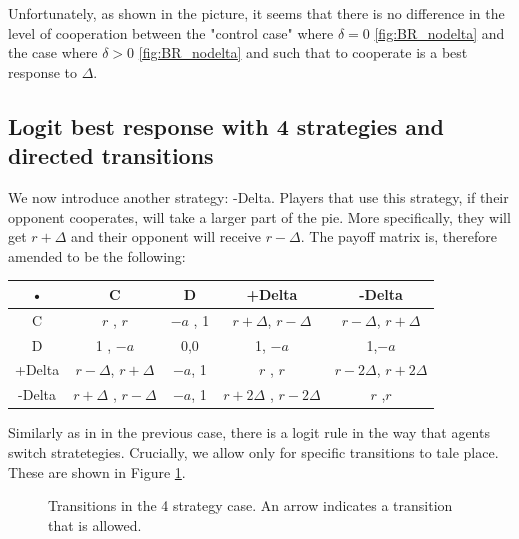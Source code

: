 \documentclass{article}
\begin{document}
Unfortunately, as shown in the picture, it seems that there is no difference in the level of cooperation between the "control case" where $\delta=0$ \ref{fig:BR_nodelta} and the case where $\delta>0$  \ref{fig:BR_nodelta} and such that to cooperate is a best response to $\Delta$.


\subsection{Logit best response with 4 strategies and directed transitions}
We now introduce another strategy: -Delta. Players that use this strategy, if their opponent cooperates, will take a larger part of the pie. More specifically, they will get $r+\Delta$ and their opponent will receive $r-\Delta$. The payoff matrix is, therefore amended to be the following:
\begin{center}
\begin{tabular}{|c|c|c|c|c|}
\hline 
• & C & D &+Delta & -Delta  \\ 
\hline 
C & $r$ , $r$ & $-a$ , 1 & $r+\Delta$, $r-\Delta$ & $r-\Delta$, $r+\Delta$ \\ 
\hline 
D & 1 , $-a$ & 0,0 & 1, $-a$ & 1,$-a$\\ 
\hline 
+Delta & $r -\Delta$, $r+\Delta$ & $-a$, 1 & $r$ , $r$& $r-2\Delta$, $r+2\Delta$ \\ 
\hline 
-Delta & $r+\Delta$ , $r-\Delta$ & $-a$, 1 & $r+2\Delta$ , $r-2\Delta$ & $r$ ,$ r$\\ 
\hline 
\end{tabular} 
\end{center}

Similarly as in in the previous case, there is a logit rule in the way that agents switch stratetegies. Crucially, we allow only for specific transitions to tale place. These are shown in Figure \ref{diagram}.  

\begin{figure}
\begin{center}
\end{center}
\caption{Transitions in the 4 strategy case. An arrow indicates a transition that is allowed.}\label{diagram}
\end{figure}
\end{document}
